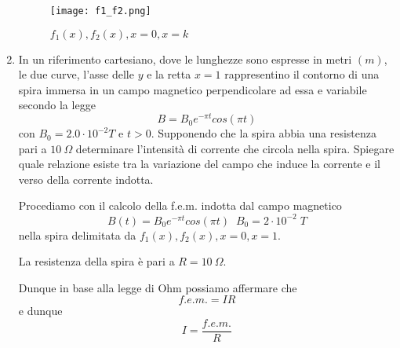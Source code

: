 \documentclass[a4paper,12pt]{article}
\begin{document}
\begin{enumerate}
\begin{figure}[H]
\centering
\texttt{[image: f1\_f2.png]}
\caption {$f_1(x), f_2(x), x=0, x=k$}
\end{figure}

\item In un riferimento cartesiano, dove le lunghezze sono espresse in metri $(m)$, le due curve, l’asse delle $y$ e la retta $x =1$ rappresentino il contorno di una spira immersa in un campo magnetico perpendicolare ad essa e variabile secondo la legge $$B = B_0e^{-\pi t}cos(\pi t)$$ 
con $B_0 = 2.0\cdot10^{-2} T$ e $ t >0$.
Supponendo che la spira abbia una resistenza pari a $10\ \Omega$ determinare l’intensità di corrente che circola nella spira. Spiegare quale relazione esiste tra la variazione del campo che induce la corrente e il verso della corrente indotta.

Procediamo con il calcolo della f.e.m. indotta dal campo magnetico
\begin{equation} B(t)=B_0e^{-\pi t}cos(\pi t) \;\; B_0=2\cdot10^{-2} \;T\end{equation}
nella spira delimitata da $f_1(x), f_2(x), x=0, x=1$.

La resistenza della spira è pari a $R=10\ \Omega$.

Dunque in base alla legge di Ohm possiamo affermare che 
\begin{equation}f.e.m.=IR\end{equation}
e dunque
\begin{equation}I=\frac{f.e.m.}{R}\end{equation}



\end{enumerate}
\end{document}
